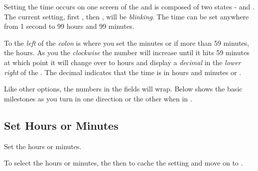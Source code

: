 Setting the time occurs on one screen of the  and is composed of two
states -  and . The current setting, first , then
, will be \textit{blinking}.  The time can be set anywhere from \num{1}
second to \num{99} hours and \num{99} minutes.


To the \textit{left} of the \textit{colon} is where you set the minutes or if
more than \num{59} minutes, the hours.  As you  the 
\textit{clockwise} the number will increase until it hits \num{59} minutes at
which point it will change over to hours and display a \textit{decimal} in the
\textit{lower right} of the .  The decimal indicates that the time is in
hours and minutes or .


Like other options, the numbers in the fields will wrap.  Below shows the basic
milestones as you turn in one direction or the other when in .


\subsection{Set Hours or Minutes} 

Set the hours or minutes.

\par\medskip

To select the hours or minutes,  the  then  to cache the
setting and move on to .



